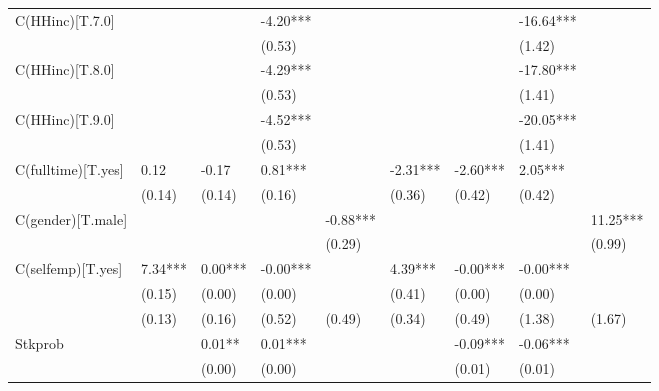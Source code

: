 \documentclass{report}
\begin{document}
\begin{table}
\begin{tabular}{lllllllll}
C(HHinc)[T.7.0]    &           &            &    -4.20*** &              &            &             &    -16.64*** &               \\
                   &           &            &      (0.53) &              &            &             &       (1.42) &               \\
C(HHinc)[T.8.0]    &           &            &    -4.29*** &              &            &             &    -17.80*** &               \\
                   &           &            &      (0.53) &              &            &             &       (1.41) &               \\
C(HHinc)[T.9.0]    &           &            &    -4.52*** &              &            &             &    -20.05*** &               \\
                   &           &            &      (0.53) &              &            &             &       (1.41) &               \\
C(fulltime)[T.yes] &      0.12 &      -0.17 &     0.81*** &              &   -2.31*** &    -2.60*** &      2.05*** &               \\
                   &    (0.14) &     (0.14) &      (0.16) &              &     (0.36) &      (0.42) &       (0.42) &               \\
C(gender)[T.male]  &           &            &             &     -0.88*** &            &             &              &      11.25*** \\
                   &           &            &             &       (0.29) &            &             &              &        (0.99) \\
C(selfemp)[T.yes]  &   7.34*** &    0.00*** &    -0.00*** &              &    4.39*** &    -0.00*** &     -0.00*** &               \\
                   &    (0.15) &     (0.00) &      (0.00) &              &     (0.41) &      (0.00) &       (0.00) &               \\
                   &    (0.13) &     (0.16) &      (0.52) &       (0.49) &     (0.34) &      (0.49) &       (1.38) &        (1.67) \\
Stkprob            &           &     0.01** &     0.01*** &              &            &    -0.09*** &     -0.06*** &               \\
                   &           &     (0.00) &      (0.00) &              &            &      (0.01) &       (0.01) &               \\

\end{tabular}
\end{table}
\end{document}
